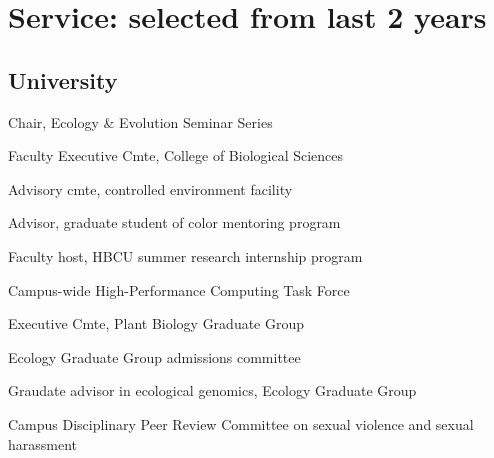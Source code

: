 \documentclass[letterpaper,10pt]{article}
\renewenvironment{itemize}{
  \begin{list}{}{
    \setlength{\leftmargin}{1.5em}
  }
}{
  \end{list}
}
\begin{document}
\section*{Service: selected from last 2 years}
\begin{itemize}
\setlength\itemsep{0ex}
\subsection*{University}
\item Chair, Ecology \& Evolution Seminar Series %
\item Faculty Executive Cmte, College of Biological Sciences %
\item Advisory cmte, controlled environment facility %
\item Advisor, graduate student of color mentoring program %
\item Faculty host, HBCU summer research internship program %
\item Campus-wide High-Performance Computing Task Force%
\item Executive Cmte, Plant Biology Graduate Group%
\item Ecology Graduate Group admissions committee%
\item Graudate advisor in ecological genomics, Ecology Graduate Group%
\item Campus Disciplinary Peer Review Committee on sexual violence and sexual harassment%

\end{itemize}
\end{document}
